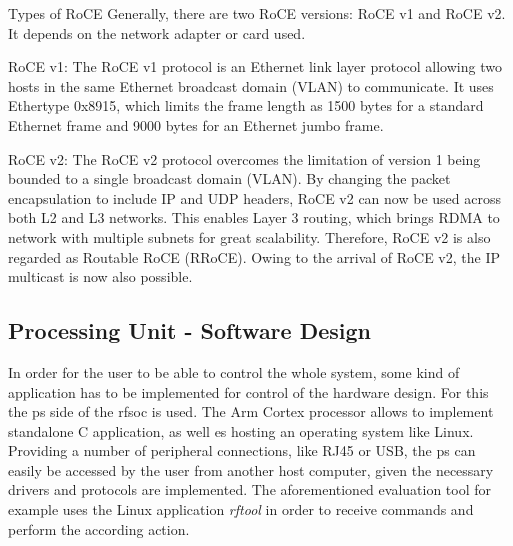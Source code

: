 Types of RoCE
Generally, there are two RoCE versions: RoCE v1 and RoCE v2. It depends on the network adapter or card used.

RoCE v1: The RoCE v1 protocol is an Ethernet link layer protocol allowing two hosts in the same Ethernet broadcast domain (VLAN) to communicate. It uses Ethertype 0x8915, which limits the frame length as 1500 bytes for a standard Ethernet frame and 9000 bytes for an Ethernet jumbo frame.

RoCE v2: The RoCE v2 protocol overcomes the limitation of version 1 being bounded to a single broadcast domain (VLAN). By changing the packet encapsulation to include IP and UDP headers, RoCE v2 can now be used across both L2 and L3 networks. This enables Layer 3 routing, which brings RDMA to network with multiple subnets for great scalability. Therefore, RoCE v2 is also regarded as Routable RoCE (RRoCE). Owing to the arrival of RoCE v2, the IP multicast is now also possible.

\subsection{Processing Unit - Software Design}
In order for the user to be able to control the whole system, some kind of application has to be implemented for control of the hardware design.
For this the \gls{ps} side of the \gls{rfsoc} is used. 
The Arm Cortex processor allows to implement standalone C application, as well es hosting an operating system like Linux. 
Providing a number of peripheral connections, like RJ45 or USB, the \gls{ps} can easily be accessed by the user from another host computer, given the necessary drivers and protocols are implemented.
The aforementioned evaluation tool for example uses the Linux application \textit{rftool} in order to receive commands and perform the according action.


